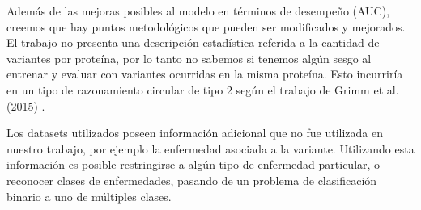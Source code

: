 Además de las mejoras posibles al modelo en términos de desempeño (AUC), creemos que hay puntos metodológicos que pueden ser modificados y mejorados. El trabajo no presenta una descripción estadística referida a la cantidad de variantes por proteína, por lo tanto no sabemos si tenemos algún sesgo al entrenar y evaluar con variantes ocurridas en la misma proteína. Esto incurriría en un tipo de razonamiento circular de tipo 2 según el trabajo de Grimm et al. (2015) \cite{doi:10.1002/humu.22768}.  

Los datasets utilizados poseen información adicional que no fue utilizada en nuestro trabajo, por ejemplo la enfermedad asociada a la variante. Utilizando esta información es posible restringirse a algún tipo de enfermedad particular, o reconocer clases de enfermedades, pasando de un problema de clasificación binario a uno de múltiples clases. 

\newpage


